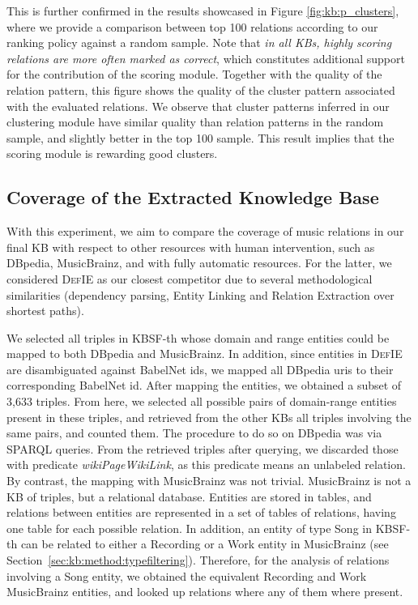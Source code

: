 This is further confirmed in the results showcased in Figure \ref{fig:kb:p_clusters}, where we provide a comparison between top 100 relations according to our ranking policy against a random sample. Note that \textit{in all KBs, highly scoring relations are more often marked as correct}, which constitutes additional support for the contribution of the scoring module. Together with the quality of the relation pattern, this figure shows the quality of the cluster pattern associated with the evaluated relations. We observe that cluster patterns inferred in our clustering module have similar quality than relation patterns in the random sample, and slightly better in the top 100 sample. This result implies that the scoring module is rewarding good clusters.

\subsection{Coverage of the Extracted Knowledge Base}
\label{sec:kb:experiments:coverage}

With this experiment, we aim to compare the coverage of music relations in our final KB with respect to other resources with human intervention, such as DBpedia, MusicBrainz, and with fully automatic resources. For the latter, we considered \textsc{DefIE} \citep{DelliBovietal2015b} as our closest competitor due to several methodological similarities (dependency parsing, Entity Linking and Relation Extraction over shortest paths). 

We selected all triples in \textsc{KBSF}-th whose domain and range entities could be mapped to both DBpedia and MusicBrainz. %
In addition, since entities in \textsc{DefIE} are disambiguated against BabelNet ids, we mapped all DBpedia uris to their corresponding BabelNet id. After mapping the entities, we obtained a subset of 3,633 triples. From here, we selected all possible pairs of domain-range entities present in these triples, and retrieved from the other KBs all triples involving the same pairs, and counted them.
The procedure to do so on DBpedia was via SPARQL queries.
From the retrieved triples after querying, we discarded those with predicate \textit{wikiPageWikiLink}, as this predicate means an unlabeled relation. By contrast, the mapping with MusicBrainz was not trivial. MusicBrainz is not a KB of triples, but a relational database. Entities are stored in tables, and relations between entities are represented in a set of tables of relations, having one table for each possible relation. %
In addition, an entity of type Song in \textsc{KBSF}-th can be related to either a Recording or a Work entity in MusicBrainz (see Section~\ref{sec:kb:method:typefiltering}). Therefore, for the analysis of relations involving a Song entity, we obtained the equivalent Recording and Work MusicBrainz entities, and looked up relations where any of them where present.

